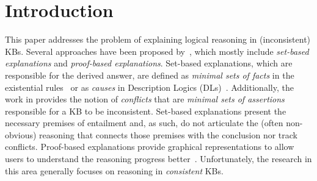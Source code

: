 \section{Introduction}
This paper addresses the problem of explaining logical reasoning in (inconsistent) KBs. Several approaches have been proposed by~\cite{Lukasiewicz2020,Thomas2022Neg,Meghyn2019,Alrabbaa2022}, which mostly include \emph{set-based explanations} and \emph{proof-based explanations}.
Set-based explanations, which are responsible for the derived answer, are defined as \emph{minimal sets of facts} in the existential rules~\cite{Lukasiewicz2020,Thomas2022Neg} or as \emph{causes} in Description Logics (DLs)~\cite{Meghyn2019}.
 Additionally, the work in \cite{Meghyn2019} provides the notion of \textit{conflicts} that are \emph{minimal sets of assertions} responsible for a KB to be inconsistent. %
Set-based explanations present the necessary premises of entailment and, as such, do not articulate the (often non-obvious) reasoning that connects those premises with the conclusion nor track conflicts. %
Proof-based explanations provide graphical representations to allow users to understand the reasoning progress better~\cite{Alrabbaa2022}. Unfortunately, the research in this area generally focuses on reasoning in \emph{consistent} KBs.

